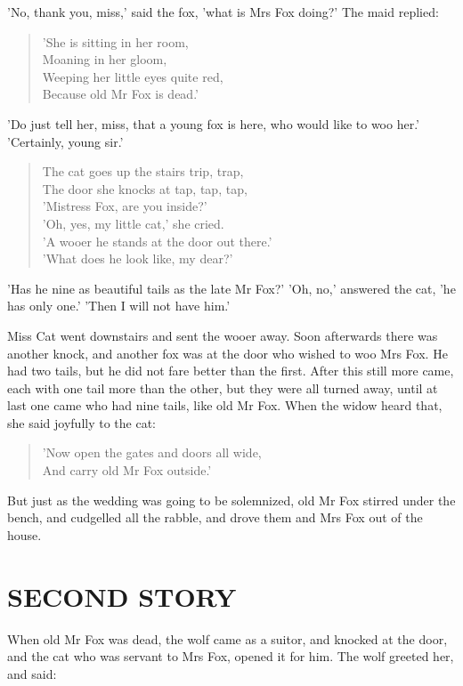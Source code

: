\documentclass[12pt]{book}
\begin{document}
'No, thank you, miss,' said the fox, 'what is Mrs Fox doing?' The maid
replied:

\begin{verse}
 'She is sitting in her room,\\
  Moaning in her gloom,\\
  Weeping her little eyes quite red,\\
  Because old Mr Fox is dead.'
\end{verse}

'Do just tell her, miss, that a young fox is here, who would like to
woo her.' 'Certainly, young sir.'

\begin{verse}
  The cat goes up the stairs trip, trap,\\
  The door she knocks at tap, tap, tap,\\
 'Mistress Fox, are you inside?'\\
 'Oh, yes, my little cat,' she cried.\\
 'A wooer he stands at the door out there.'\\
 'What does he look like, my dear?'
\end{verse}

'Has he nine as beautiful tails as the late Mr Fox?' 'Oh, no,'
answered the cat, 'he has only one.' 'Then I will not have him.'

Miss Cat went downstairs and sent the wooer away. Soon afterwards
there was another knock, and another fox was at the door who wished to
woo Mrs Fox. He had two tails, but he did not fare better than the
first. After this still more came, each with one tail more than the
other, but they were all turned away, until at last one came who had
nine tails, like old Mr Fox. When the widow heard that, she said
joyfully to the cat:

\begin{verse}
 'Now open the gates and doors all wide,\\
  And carry old Mr Fox outside.'
\end{verse}

But just as the wedding was going to be solemnized, old Mr Fox stirred
under the bench, and cudgelled all the rabble, and drove them and Mrs
Fox out of the house.


\section{SECOND STORY}

When old Mr Fox was dead, the wolf came as a suitor, and knocked at
the door, and the cat who was servant to Mrs Fox, opened it for him.
The wolf greeted her, and said:
\end{document}
